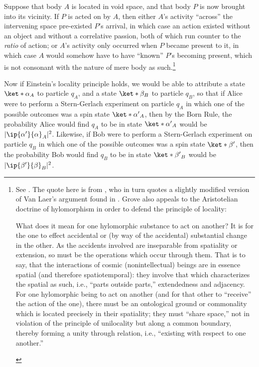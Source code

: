 \documentclass[12pt]{report}
\begin{document}
\begin{adjustwidth}{1cm}{}
	\begin{displayquote}
Suppose that body $A$ is located in void space, and that body $P$ is now brought into its vicinity. If $P$ is acted on by $A$, then either $A$'s activity ``across'' the intervening space pre-existed $P$'s arrival, in which case an action existed without an object and without a correlative passion, both of which run counter to the \emph{ratio} of action; or $A$'s activity only occurred when $P$ became present to it, in which case $A$ would somehow have to have ``known'' $P$'s becoming present, which is not consonant with the nature of mere body as such.\footnote{See \cite[59-144]{LaerP.H.van1953Pp}. The quote here is from \cite[246]{Grove}, who in turn quotes a slightly modified version of Van Laer's argument found in \cite[257]{TallaricoJames1962AaaD}. Grove also appeals to the Aristotelian doctrine of hylomorphism in order to defend the principle of locality: 
	\begin{displayquote}
        What does it mean for one hylomorphic substance to act on another? It is for the one to effect accidental or (by way of the accidental) substantial change in the other. As the accidents involved are inseparable from spatiality or extension, so must be the operations which occur through them. That is to say, that the interactions of cosmic (nonintellectual) beings are in essence spatial (and therefore spatiotemporal): they involve that which characterizes the spatial as such, i.e., ``parts outside parts,'' extendedness and adjacency. For one hylomorphic being to act on another (and for that other to ``receive'' the action of the one), there must be an ontological ground or commonality which is located precisely in their spatiality; they must ``share space,'' not in violation of the principle of unilocality but along a common boundary, thereby forming a unity through relation, i.e., ``existing with respect to one another.''
    \end{displayquote}
  }
\end{displayquote}
\end{adjustwidth}

Now if Einstein's locality principle holds, we would be able to attribute a state $\ket*{\alpha}_A$ to particle $q_A$, and a state $\ket*{\beta}_B$ to particle $q_B$, %
%
so that if Alice were to perform a Stern-Gerlach experiment on particle $q_A$ in which one of the possible outcomes was a spin state $\ket*{\alpha'}_A$, then by the Born Rule, the probability Alice would find $q_A$ to be in state $\ket*{\alpha'}_A$ would be $|\ip{\alpha'}{\alpha}_A|^2$. Likewise, if Bob were to perform a Stern-Gerlach experiment on particle $q_B$ in which one of the possible outcomes was a spin state $\ket*{\beta'}$, then the probability Bob would find $q_B$ to be in state $\ket*{\beta'}_B$ would be $|\ip{\beta'}{\beta}_B|^2$. 
\end{document}
